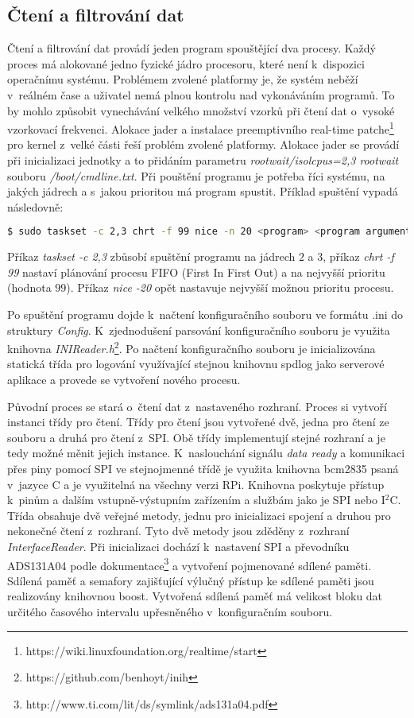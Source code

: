 \subsection{Čtení a filtrování dat} \label{sec:readAndFilter}
Čtení a filtrování dat provádí jeden program spouštějící dva procesy. Každý proces má alokované jedno fyzické jádro procesoru, které není k~dispozici operačnímu systému. Problémem zvolené platformy je, že systém neběží v~reálném čase a uživatel nemá plnou kontrolu nad vykonáváním programů. To by mohlo způsobit vynechávání velkého množství vzorků při čtení dat o~vysoké vzorkovací frekvenci. Alokace jader a instalace preemptivního real-time patche\footnote{https://wiki.linuxfoundation.org/realtime/start} pro kernel z~velké části řeší problém zvolené platformy. Alokace jader se provádí při inicializaci jednotky a to přidáním parametru \textit{rootwait/isolcpus=2,3 rootwait} souboru \textit{/boot/cmdline.txt}. Při pouštění programu je potřeba říci systému, na jakých jádrech a s~jakou prioritou má program spustit. Příklad spuštění vypadá následovně:
\begin{lstlisting}[language=bash, breaklines]
 $ sudo taskset -c 2,3 chrt -f 99 nice -n 20 <program> <program arguments>
\end{lstlisting}
Příkaz \textit{taskset -c 2,3} zbůsobí spuštění programu na jádrech $2$ a $3$, příkaz \textit{chrt -f 99} nastaví plánování procesu FIFO (First In First Out) a na nejvyšší prioritu (hodnota $99$). Příkaz \textit{nice -20} opět nastavuje nejvyšší možnou prioritu procesu.

Po spuštění programu dojde k~načtení konfiguračního souboru ve formátu .ini do struktury \textit{Config}. K~zjednodušení parsování konfiguračního souboru je využita knihovna \textit{INIReader.h}\footnote{https://github.com/benhoyt/inih}. Po načtení konfiguračního souboru je inicializována statická třída pro logování využívající stejnou knihovnu spdlog jako serverové aplikace a provede se vytvoření nového procesu. 

Původní proces se stará o~čtení dat z~nastaveného rozhraní. Proces si vytvoří instanci třídy pro čtení. Třídy pro čtení jsou vytvořené dvě, jedna pro čtení ze souboru a druhá pro čtení z~SPI. Obě třídy implementují stejné rozhraní a je tedy možné měnit jejich instance. K~naslouchání signálu \textit{data ready} a komunikaci přes piny pomocí SPI ve stejnojmenné třídě je využita knihovna bcm2835 psaná v~jazyce C a je využitelná na všechny verzi RPi. Knihovna poskytuje přístup k~pinům a dalším vstupně-výstupním zařízením a službám jako je SPI nebo I$^2$C. Třída obsahuje dvě veřejné metody, jednu pro inicializaci spojení a druhou pro nekonečné čtení z~rozhraní. Tyto dvě metody jsou zděděny z~rozhraní \textit{InterfaceReader}. Při inicializaci dochází k~nastavení SPI a převodníku ADS131A04 podle dokumentace\footnote{http://www.ti.com/lit/ds/symlink/ads131a04.pdf} a vytvoření pojmenované sdílené paměti. Sdílená paměť a semafory zajišťující výlučný přístup ke sdílené paměti jsou realizovány knihovnou boost. Vytvořená sdílená paměť má velikost bloku dat určitého časového intervalu upřesněného v~konfiguračním souboru.

